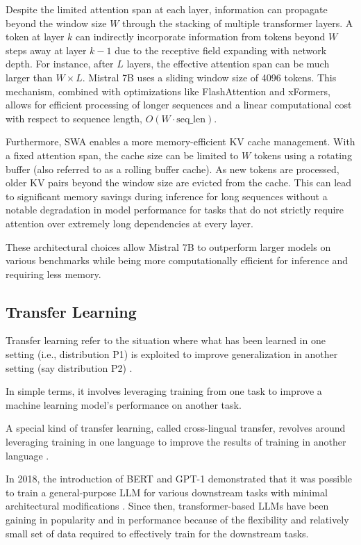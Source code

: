 Despite the limited attention span at each layer, information can propagate beyond the window size $W$ through the stacking of multiple transformer layers. A token at layer $k$ can indirectly incorporate information from tokens beyond $W$ steps away at layer $k-1$ due to the receptive field expanding with network depth. For instance, after $L$ layers, the effective attention span can be much larger than $W \times L$. Mistral 7B uses a sliding window size of 4096 tokens. This mechanism, combined with optimizations like FlashAttention \cite{dao2022flashattention} and xFormers, allows for efficient processing of longer sequences and a linear computational cost with respect to sequence length, $O(W \cdot \text{seq\_len})$.

Furthermore, SWA enables a more memory-efficient KV cache management. With a fixed attention span, the cache size can be limited to $W$ tokens using a rotating buffer (also referred to as a rolling buffer cache). As new tokens are processed, older KV pairs beyond the window size are evicted from the cache. This can lead to significant memory savings during inference for long sequences without a notable degradation in model performance for tasks that do not strictly require attention over extremely long dependencies at every layer.

These architectural choices allow Mistral 7B to outperform larger models on various benchmarks while being more computationally efficient for inference and requiring less memory.
\subsection{Transfer Learning}
\begin{definition}
    Transfer learning refer to the situation where what has been
learned in one setting (i.e., distribution P1) is exploited to improve generalization
in another setting (say distribution P2) \cite{goodfellow2016deep}.
\end{definition}

In simple terms, it involves leveraging training from one task to improve a machine learning model’s performance on another task.

A special kind of transfer learning, called cross-lingual transfer, revolves around leveraging training in one language to improve the results of training in another language \cite{cross_lingual_transfer}.

In 2018, the introduction of BERT and GPT-1 demonstrated that it was possible to train a general-purpose LLM for various downstream tasks with minimal architectural modifications \cite{devlin2019bert,lee2018pre}. Since then, transformer-based LLMs have been gaining in popularity and in performance because of the flexibility and relatively small set of data required to effectively train for the downstream tasks.

